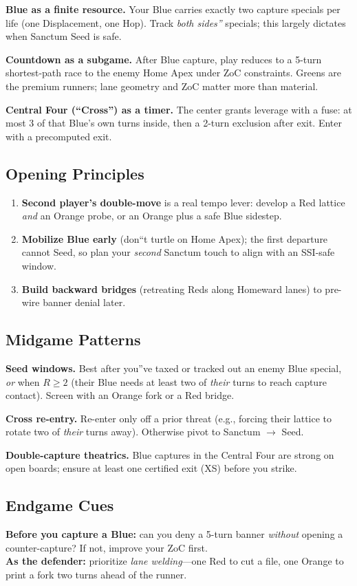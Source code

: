 \documentclass[11pt]{article}
\begin{document}
\textbf{Blue as a finite resource.} Your Blue carries exactly two capture specials per life (one Displacement, one Hop). Track \emph{both sides''} specials; this largely dictates when Sanctum Seed is safe.

\textbf{Countdown as a subgame.} After Blue capture, play reduces to a 5-turn shortest-path race to the enemy Home Apex under ZoC constraints. Greens are the premium runners; lane geometry and ZoC matter more than material.

\textbf{Central Four (``Cross'') as a timer.} The center grants leverage with a fuse: at most 3 of that Blue's own turns inside, then a 2-turn exclusion after exit. Enter with a precomputed exit.

\bigskip

\subsection*{Opening Principles}
\begin{enumerate}
  \item \textbf{Second player's double-move} is a real tempo lever: develop a Red lattice \emph{and} an Orange probe, or an Orange plus a safe Blue sidestep.
  \item \textbf{Mobilize Blue early} (don``t turtle on Home Apex); the first departure cannot Seed, so plan your \emph{second} Sanctum touch to align with an SSI-safe window.
  \item \textbf{Build backward bridges} (retreating Reds along Homeward lanes) to pre-wire banner denial later.
\end{enumerate}

\subsection*{Midgame Patterns}
\textbf{Seed windows.} Best after you''ve taxed or tracked out an enemy Blue special, \emph{or} when $R\!\ge\!2$ (their Blue needs at least two of \emph{their} turns to reach capture contact). Screen with an Orange fork or a Red bridge.

\textbf{Cross re-entry.} Re-enter only off a prior threat (e.g., forcing their lattice to rotate two of \emph{their} turns away). Otherwise pivot to Sanctum $\rightarrow$ Seed.

\textbf{Double-capture theatrics.} Blue captures in the Central Four are strong on open boards; ensure at least one certified exit (XS) before you strike.

\subsection*{Endgame Cues}
\textbf{Before you capture a Blue:} can you deny a 5-turn banner \emph{without} opening a counter-capture? If not, improve your ZoC first.\\
\textbf{As the defender:} prioritize \emph{lane welding}---one Red to cut a file, one Orange to print a fork two turns ahead of the runner.
\end{document}
